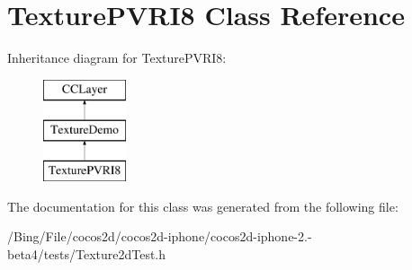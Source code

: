 \hypertarget{interface_texture_p_v_r_i8}{\section{Texture\-P\-V\-R\-I8 Class Reference}
\label{interface_texture_p_v_r_i8}
}
Inheritance diagram for Texture\-P\-V\-R\-I8\-:\begin{figure}[H]
\begin{center}
\leavevmode
\includegraphics[height=3.000000cm]{interface_texture_p_v_r_i8}
\end{center}
\end{figure}


The documentation for this class was generated from the following file\-:\begin{DoxyCompactItemize}
\item 
/\-Bing/\-File/cocos2d/cocos2d-\/iphone/cocos2d-\/iphone-\/2.-\/beta4/tests/Texture2d\-Test.\-h\end{DoxyCompactItemize}
